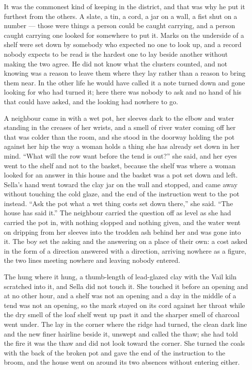 It was the commonest kind of keeping in the district, and that was why he put it furthest from the others. A slate, a tin, a cord, a jar on a wall, a fist shut on a number --- those were things a person could be caught carrying, and a person caught carrying one looked for somewhere to put it. Marks on the underside of a shelf were set down by somebody who expected no one to look up, and a record nobody expects to be read is the hardest one to lay beside another without making the two agree. He did not know what the clusters counted, and not knowing was a reason to leave them where they lay rather than a reason to bring them near. In the other life he would have called it a note turned down and gone looking for who had turned it; here there was nobody to ask and no hand of his that could have asked, and the looking had nowhere to go.

\scenebreak

A neighbour came in with a wet pot, her sleeves dark to the elbow and water standing in the creases of her wrists, and a smell of river water coming off her that was colder than the room, and she stood in the doorway holding the pot against her hip the way a woman holds a thing she has already set down in her mind. “What will the row want before the tend is out?” she said, and her eyes went to the shelf and not to the basket, because the shelf was where a woman looked for an answer in this house and the basket was a pot set down and left. Sella's hand went toward the clay jar on the wall and stopped, and came away without touching the cold glaze, and the end of the instruction went to the pot instead. “Ask the pot what a wet thing costs set down there,” she said. “The house has said it.” The neighbour carried the question off as level as she had carried the pot in, with nothing slopped and nothing given, and the water went on dripping from her sleeves into the trodden ash behind her and was gone into it. The boy set the asking and the answering on a place of their own: a cost asked in the form of a direction answered with a direction, arriving nowhere as a figure, the two lines meeting nowhere and leaving nobody entered.

The  hung where it hung, a thumb-length of lead-glazed clay with the Vail kiln scratched into it, and Sella did not touch it. She touched it before an opening and at no other hour, and a shelf was not an opening and a day in the middle of a tend was not an opening, so the mark stayed on its cord against her throat while the dry smell of the loaf shelf went up past it and the sharper smell of charcoal went under. The  lay in the corner where the ridge had turned, the clean dark line and the new finer hairline beside it, unswept and called the thaw; she had told the fire it was the thaw and did not look toward the corner. She turned the coals with the back of the broken pot and gave the end of the instruction to the broom, and the house went on around its two absences without entering either.

